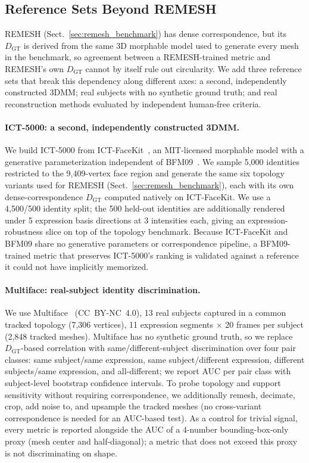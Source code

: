 \documentclass[10pt,twocolumn,letterpaper]{article}
\begin{document}
\subsection{Reference Sets Beyond REMESH}
\label{sec:ref_sets}
REMESH (Sect.~\ref{sec:remesh_benchmark}) has dense correspondence, but its $D_{\mathrm{GT}}$ is derived from the same 3D morphable model used to generate every mesh in the benchmark, so agreement between a REMESH-trained metric and REMESH's own $D_{\mathrm{GT}}$ cannot by itself rule out circularity. We add three reference sets that break this dependency along different axes: a second, independently constructed 3DMM; real subjects with no synthetic ground truth; and real reconstruction methods evaluated by independent human-free criteria.

\paragraph{ICT-5000: a second, independently constructed 3DMM.}
We build ICT-5000 from ICT-FaceKit~\cite{ict-facekit}, an MIT-licensed morphable model with a generative parameterization independent of BFM09~\cite{paysan2009bfm}. We sample 5,000 identities restricted to the 9,409-vertex face region and generate the same six topology variants used for REMESH (Sect.~\ref{sec:remesh_benchmark}), each with its own dense-correspondence $D_{\mathrm{GT}}$ computed natively on ICT-FaceKit. We use a 4,500/500 identity split; the 500 held-out identities are additionally rendered under 5 expression basis directions at 3 intensities each, giving an expression-robustness slice on top of the topology benchmark. Because ICT-FaceKit and BFM09 share no generative parameters or correspondence pipeline, a BFM09-trained metric that preserves ICT-5000's ranking is validated against a reference it could not have implicitly memorized.

\paragraph{Multiface: real-subject identity discrimination.}
We use Multiface~\cite{wuu2022multiface} (CC~BY-NC~4.0), 13 real subjects captured in a common tracked topology (7,306 vertices), 11 expression segments $\times$ 20 frames per subject (2,848 tracked meshes). Multiface has no synthetic ground truth, so we replace $D_{\mathrm{GT}}$-based correlation with same/different-subject discrimination over four pair classes: same subject/same expression, same subject/different expression, different subjects/same expression, and all-different; we report AUC per pair class with subject-level bootstrap confidence intervals. To probe topology and support sensitivity without requiring correspondence, we additionally remesh, decimate, crop, add noise to, and upsample the tracked meshes (no cross-variant correspondence is needed for an AUC-based test). As a control for trivial signal, every metric is reported alongside the AUC of a 4-number bounding-box-only proxy (mesh center and half-diagonal); a metric that does not exceed this proxy is not discriminating on shape.
\end{document}
